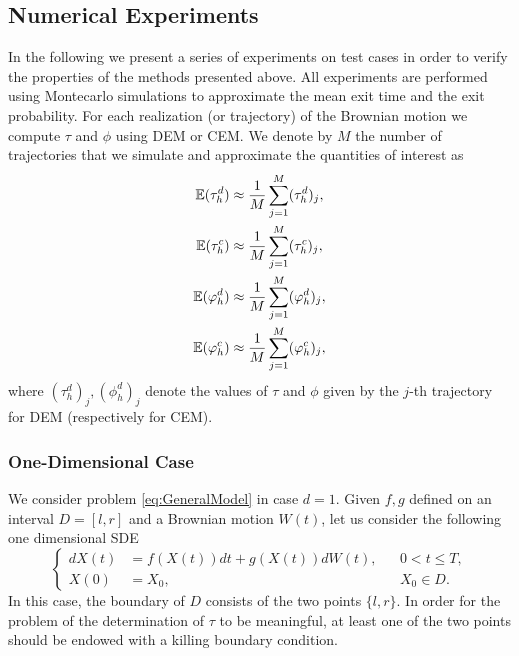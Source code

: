 \subsection{Numerical Experiments}
In the following we present a series of experiments on test cases in order to verify the properties of the methods presented above. All experiments are performed using Montecarlo simulations to approximate the mean exit time and the exit probability. For each realization (or trajectory) of the Brownian motion we compute $\tau$ and $\phi$ using DEM or CEM. We denote by $M$ the number of trajectories that we simulate and approximate the quantities of interest as
\begin{equation}\label{eq:MonteCarlo}
\begin{aligned}
	\mathbb{E}(\tau_h^d) &\approx \frac{1}{M} \sum_{j=1}^M (\tau_h^d)_j, \\
	\mathbb{E}(\tau_h^c) &\approx \frac{1}{M} \sum_{j=1}^M (\tau_h^c)_j, \\
	\mathbb{E}(\varphi_h^d) &\approx \frac{1}{M} \sum_{j=1}^M (\varphi_h^d)_j, \\	
	\mathbb{E}(\varphi_h^c) &\approx \frac{1}{M} \sum_{j=1}^M (\varphi_h^c)_j, \\	
\end{aligned}
\end{equation}
where $(\tau_h^d)_j, (\phi_h^d)_j$ denote the values of $\tau$ and $\phi$ given by the $j$-th trajectory for DEM (respectively for CEM). 
\subsubsection{One-Dimensional Case}
We consider problem \eqref{eq:GeneralModel} in case $d = 1$. Given $f,g$ defined on an interval $D = \left[l,r\right]$ and a Brownian motion $W(t)$, let us consider the following one dimensional SDE
\begin{equation}\label{eq:OneDModel}
\left \{
\begin{aligned}
	dX(t) &= f(X(t)) dt + g(X(t))dW(t), && 0 < t \leq T, \\
	X(0)  &= X_0, && X_0 \in D.
\end{aligned} \right .
\end{equation}
In this case, the boundary of $D$ consists of the two points $\{l,r\}$. In order for the problem of the determination of $\tau$ to be meaningful, at least one of the two points should be endowed with a killing boundary condition. 



